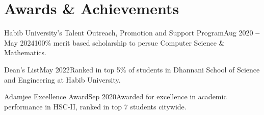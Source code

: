 \section{Awards \& Achievements}
\vspace{2pt}
\resumeSubHeadingListStart

\resumeOrganizationHeading
{Habib University's Talent Outreach, Promotion and Support Program}{Aug 2020 \textbf{--} May 2024}{100\% merit based scholarship to persue Computer Science \& Mathematics.}

\resumeOrganizationHeading
{Dean's List}{May 2022}{Ranked in top 5\% of students in Dhannani School of Science and Engineering at Habib University.}

\resumeOrganizationHeading
{Adamjee Excellence Award}{Sep 2020}{Awarded for excellence in academic performance in HSC-II, ranked in top 7 students citywide.}


\resumeSubHeadingListEnd